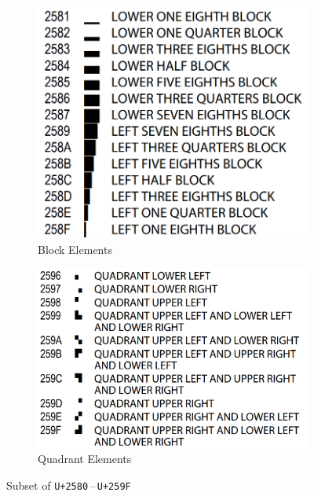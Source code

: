\begin{figure}[htb]
  \centering
  \hspace{0.3em}
  \begin{subfigure}[htb]{0.4\textwidth}
    \includegraphics[width=\textwidth]{resources/block_elements}
    \caption{Block Elements}
\label{fig:unicode_block_characters}
  \end{subfigure}
  \hfill
  \begin{subfigure}[htb]{0.51\textwidth}
    \includegraphics[width=\textwidth]{resources/quadrant_elements}
    \caption{Quadrant Elements}
\label{fig:unicode_quadrant_characters}
  \end{subfigure}
  \caption{Subset of \texttt{U+2580}\,--\,\texttt{U+259F}~\cite{unicode}}
\label{fig:unicode_characters}
\end{figure}

